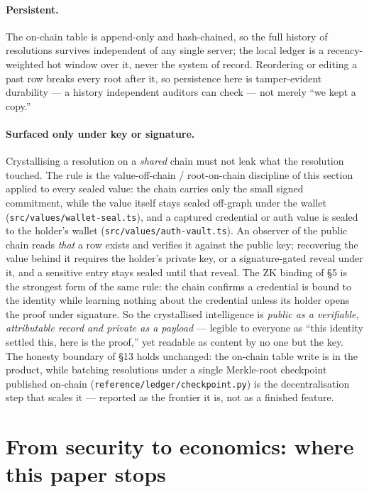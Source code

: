 \documentclass[11pt]{article}
\begin{document}
\paragraph{Persistent.} The on-chain table is append-only and hash-chained, so the
full history of resolutions survives independent of any single server; the local
ledger is a recency-weighted hot window over it, never the system of record. Reordering
or editing a past row breaks every root after it, so persistence here is tamper-evident
durability --- a history independent auditors can check --- not merely ``we kept a copy.''

\paragraph{Surfaced only under key or signature.} Crystallising a resolution on a
\emph{shared} chain must not leak what the resolution touched. The rule is the
value-off-chain / root-on-chain discipline of this section applied to every sealed
value: the chain carries only the small signed commitment, while the value itself
stays sealed off-graph under the wallet (\texttt{src/values/wallet-seal.ts}), and a
captured credential or auth value is sealed to the holder's wallet
(\texttt{src/values/auth-vault.ts}). An observer of the public chain reads \emph{that}
a row exists and verifies it against the public key; recovering the value behind it
requires the holder's private key, or a signature-gated reveal under it, and a
sensitive entry stays sealed until that reveal. The ZK binding of \S5 is the strongest
form of the same rule: the chain confirms a credential is bound to the identity while
learning nothing about the credential unless its holder opens the proof under
signature. So the crystallised intelligence is \emph{public as a verifiable,
attributable record and private as a payload} --- legible to everyone as ``this
identity settled this, here is the proof,'' yet readable as content by no one but the
key. The honesty boundary of \S13 holds unchanged: the on-chain table write is in the
product, while batching resolutions under a single Merkle-root checkpoint published
on-chain (\texttt{reference/ledger/checkpoint.py}) is the decentralisation step that
scales it --- reported as the frontier it is, not as a finished feature.

\section{From security to economics: where this paper stops}
\label{sec:economics}
\end{document}
